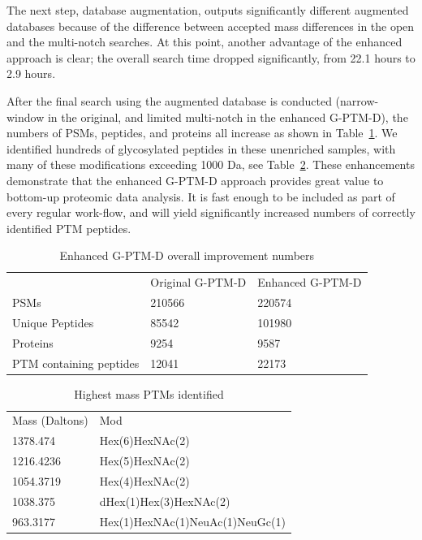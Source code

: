 \documentclass[journal=jprobs,manuscript=article]{achemso}
\begin{document}
The next step, database augmentation, outputs significantly different augmented databases because of the difference between accepted mass differences in the open and the multi-notch searches.
At this point, another advantage of the enhanced approach is clear; the overall search time dropped significantly, from 22.1 hours to 2.9 hours.

After the final search using the augmented database is conducted (narrow-window in the original, and limited multi-notch in the enhanced G-PTM-D), the numbers of PSMs, peptides, and proteins all increase as shown in Table~\ref{tab:table2}.
We identified hundreds of glycosylated peptides in these unenriched samples, with many of these modifications exceeding 1000 Da, see Table~\ref{tab:table3}.
These enhancements demonstrate that the enhanced G-PTM-D approach provides great value to bottom-up proteomic data analysis.
It is fast enough to be included as part of every regular work-flow, and will yield significantly increased numbers of correctly identified PTM peptides.

\begin{table}[]
\centering
\caption{Enhanced G-PTM-D overall improvement numbers}
\label{tab:table2}
\begin{tabular}{lll}
                             & Original G-PTM-D & Enhanced G-PTM-D\\
PSMs &  210566   &  220574  \\
Unique Peptides &  85542   &  101980  \\
Proteins &  9254   &  9587  \\
PTM containing peptides &  12041   &  22173  \\
\end{tabular}
\end{table}


\begin{table}[]
\centering
\caption{Highest mass PTMs identified}
\label{tab:table3}
\begin{tabular}{ll}
Mass (Daltons)&	Mod\\
1378.474&	Hex(6)HexNAc(2)\\
1216.4236&	Hex(5)HexNAc(2)\\
1054.3719&	Hex(4)HexNAc(2)\\
1038.375&	dHex(1)Hex(3)HexNAc(2)\\
963.3177&	Hex(1)HexNAc(1)NeuAc(1)NeuGc(1)
\end{tabular}
\end{table}








\end{document}

